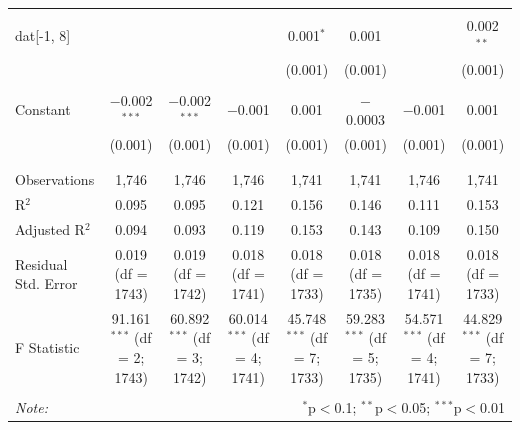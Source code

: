 \begin{table}[!htbp]
\begin{tabular}{@{\extracolsep{5pt}}lccccccc}
  & & & & & & & \\ 
 dat[-1, 8] &  &  &  & 0.001$^{*}$ & 0.001 &  & 0.002$^{**}$ \\ 
  &  &  &  & (0.001) & (0.001) &  & (0.001) \\ 
  & & & & & & & \\ 
 Constant & $-$0.002$^{***}$ & $-$0.002$^{***}$ & $-$0.001 & 0.001 & $-$0.0003 & $-$0.001 & 0.001 \\ 
  & (0.001) & (0.001) & (0.001) & (0.001) & (0.001) & (0.001) & (0.001) \\ 
  & & & & & & & \\ 
\hline \\[-1.8ex] 
Observations & 1,746 & 1,746 & 1,746 & 1,741 & 1,741 & 1,746 & 1,741 \\ 
R$^{2}$ & 0.095 & 0.095 & 0.121 & 0.156 & 0.146 & 0.111 & 0.153 \\ 
Adjusted R$^{2}$ & 0.094 & 0.093 & 0.119 & 0.153 & 0.143 & 0.109 & 0.150 \\ 
Residual Std. Error & 0.019 (df = 1743) & 0.019 (df = 1742) & 0.018 (df = 1741) & 0.018 (df = 1733) & 0.018 (df = 1735) & 0.018 (df = 1741) & 0.018 (df = 1733) \\ 
F Statistic & 91.161$^{***}$ (df = 2; 1743) & 60.892$^{***}$ (df = 3; 1742) & 60.014$^{***}$ (df = 4; 1741) & 45.748$^{***}$ (df = 7; 1733) & 59.283$^{***}$ (df = 5; 1735) & 54.571$^{***}$ (df = 4; 1741) & 44.829$^{***}$ (df = 7; 1733) \\ 
\hline 
\hline \\[-1.8ex] 
\textit{Note:}  & \multicolumn{7}{r}{$^{*}$p$<$0.1; $^{**}$p$<$0.05; $^{***}$p$<$0.01} \\ 
\end{tabular} 
\end{table} 
